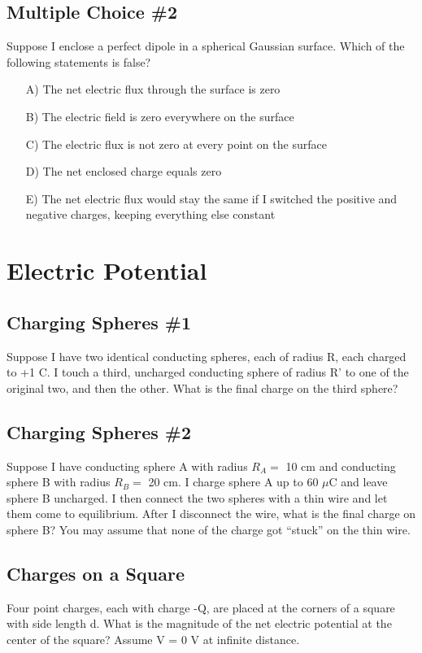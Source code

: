 \documentclass[11pt]{article}
\begin{document}
\subsection{Multiple Choice \#2}
Suppose I enclose a perfect dipole in a spherical Gaussian surface.  Which of the following statements is false?

\begin{itemize}
\item[A)] The net electric flux through the surface is zero
\item[B)] The electric field is zero everywhere on the surface
\item[C)] The electric flux is not zero at every point on the surface
\item[D)] The net enclosed charge equals zero
\item[E)] The net electric flux would stay the same if I switched the positive and negative charges, keeping everything else constant
\end{itemize}


\pagebreak
\section{Electric Potential}

\subsection{Charging Spheres \#1}
Suppose I have two identical conducting spheres, each of radius R, each charged to +1 C.  I touch a third, uncharged conducting sphere of radius R' to one of the original two, and then the other.  What is the final charge on the third sphere?

\subsection{Charging Spheres \#2}
Suppose I have conducting sphere A with radius $R_A=$ 10 cm and conducting sphere B with radius $R_B=$ 20 cm.  I charge sphere A up to 60 $\mu$C and leave sphere B uncharged.  I then connect the two spheres with a thin wire and let them come to equilibrium.  After I disconnect the wire, what is the final charge on sphere B?  You may assume that none of the charge got “stuck” on the thin wire.

\subsection{Charges on a Square}
Four point charges, each with charge -Q, are placed at the corners of a square with side length d.  What is the magnitude of the net electric potential at the center of the square?  Assume V = 0 V at infinite distance.
\end{document}
